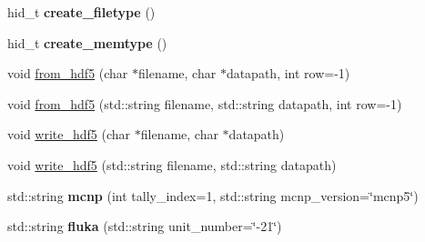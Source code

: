 \begin{DoxyCompactItemize}
hid\+\_\+t {\bfseries create\+\_\+filetype} ()
\item 
\mbox{\label{classpyne_1_1_tally_a8fcd447da4e33f35ecd893284dee4bd6}} 
hid\+\_\+t {\bfseries create\+\_\+memtype} ()
\item 
void \hyperlink{classpyne_1_1_tally_a35a1d7e9e2b982df18f5f54e69c27e67}{from\+\_\+hdf5} (char $\ast$filename, char $\ast$datapath, int row=-\/1)
\item 
void \hyperlink{classpyne_1_1_tally_a4386d5c391675c4f079f18c8775d4a9a}{from\+\_\+hdf5} (std\+::string filename, std\+::string datapath, int row=-\/1)
\item 
void \hyperlink{classpyne_1_1_tally_a26dbc6f9410d9bdd1e780338ec4551b2}{write\+\_\+hdf5} (char $\ast$filename, char $\ast$datapath)
\item 
void \hyperlink{classpyne_1_1_tally_abc2ff249b426b47b2beb1bfeeacbbe62}{write\+\_\+hdf5} (std\+::string filename, std\+::string datapath)
\item 
\mbox{\label{classpyne_1_1_tally_af7d713e5cd828b3f145950e3930e0f7b}} 
std\+::string {\bfseries mcnp} (int tally\+\_\+index=1, std\+::string mcnp\+\_\+version=\char`\"{}mcnp5\char`\"{})
\item 
\mbox{\label{classpyne_1_1_tally_ae9393f61301395a0994c1a39b1dc29ad}} 
std\+::string {\bfseries fluka} (std\+::string unit\+\_\+number=\char`\"{}-\/21\char`\"{})
\end{DoxyCompactItemize}
